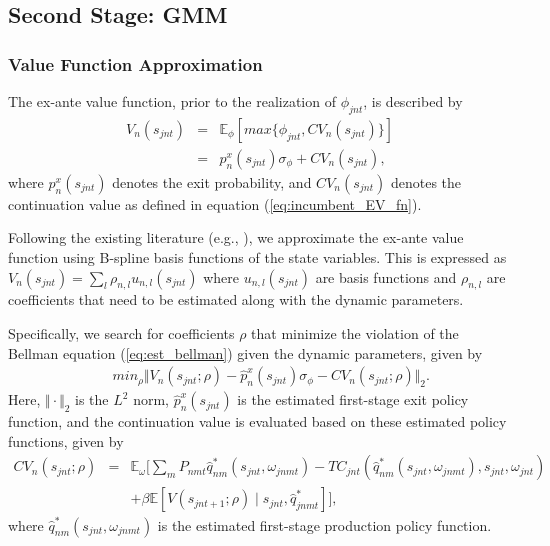 \documentclass[12pt, letter]{article}
\begin{document}
\subsection{Second Stage: GMM}
\label{subsec:est_dynamic_second}

\subsubsection{Value Function Approximation}
The ex-ante value function, prior to the realization of $\phi_{jnt}$, is described by
\begin{eqnarray}
    V_n(s_{jnt}) & = & \mathbb{E}_\phi[ max\{\phi_{jnt},CV_n(s_{jnt})\}] \nonumber \\
    & = &  p_n^x(s_{jnt}) \sigma_\phi + CV_n(s_{jnt}), \label{eq:est_bellman}
\end{eqnarray}
where $p_n^x(s_{jnt})$ denotes the exit probability, and $CV_n(s_{jnt})$ denotes the continuation value as defined in equation (\ref{eq:incumbent_EV_fn}).

Following the existing literature (e.g., \citet{sweeting2013dynamic}), we approximate the ex-ante value function using B-spline basis functions of the state variables. This is expressed as $V_n(s_{jnt}) = \sum_l \rho_{n,l} u_{n,l}(s_{jnt})$ where $u_{n,l}(s_{jnt})$ are basis functions and $\rho_{n,l}$ are coefficients that need to be estimated along with the dynamic parameters.

Specifically, we search for coefficients $\rho$ that minimize the violation of the Bellman equation (\ref{eq:est_bellman}) given the dynamic parameters, given by
\begin{eqnarray}
     &  & min_{\rho} \Vert V_n(s_{jnt};\rho) -\hat{p}^x_n(s_{jnt}) \sigma_{\phi} - CV_n(s_{jnt};\rho)\Vert_2.\label{eq:est_value_func_approx}
\end{eqnarray}
Here, $\Vert \cdot \Vert_2$ is the $L^2$ norm, $\hat{p}^x_n(s_{jnt})$ is the estimated first-stage exit policy function, and the continuation value is evaluated based on these estimated policy functions, given by
\begin{eqnarray*}
CV_n(s_{jnt};\rho) & = & \mathbb{E}_{\omega} \Big[ \sum_m P_{nmt} \hat{q}^*_{nm}(s_{jnt},\omega_{jnmt}) - TC_{jnt}(\hat{q}^*_{nm}(s_{jnt},\omega_{jnmt}),s_{jnt},\omega_{jnt}) \\
&& + \beta \mathbb{E}[V(s_{jnt+1};\rho)\mid s_{jnt}, \hat{q}^*_{jnmt}] \Big],
\end{eqnarray*}
where $\hat{q}^*_{nm}(s_{jnt},\omega_{jnmt})$ is the estimated first-stage production policy function.
\end{document}
